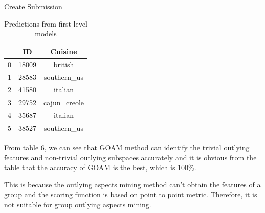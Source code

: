 \documentclass[
 size=14pt,
 paper=smartboard,  %
 mode=present, 		%
 display=slides, 	%
 style=tuliplab,  	%
 pauseslide,
 fleqn,leqno]{powerdot}
\begin{document}
  

  \begin{slide}[toc=,bm=]{Create Submission}

    \begin{table}[tb]
    \setlength{\abovecaptionskip}{0pt}
    \setlength{\belowcaptionskip}{10pt}
    \centering
    \caption{Predictions from first level models}
    
    \begin{tabular}{ c | c | c }
    \toprule
          &  ID    & Cuisine \\
    \midrule
    0 &  18009    &  british  \\
    
    1 &  28583    &  southern_us \\
    
    2 &   41580    &  italian \\
    3 &   29752    &  cajun_creole \\
    4 &   35687    &  italian    \\
    5 &   38527    &  southern_us\\
    \bottomrule
    \end{tabular}
    \end{table}
    
    \begin{note}
    From table $6$,
    we can see that GOAM method can identify the trivial outlying features
    and non-trivial outlying subspaces accurately and
    it is obvious from the table that the accuracy of GOAM is the best,
    which is 100\%.
    
    This is because the outlying aspects mining method
    can't obtain the features of a group and the scoring function
    is based on point to point metric.
    Therefore,
    it is not suitable for group outlying aspects mining.
    \end{note}
    
    \end{slide}
\end{document}
